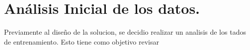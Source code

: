 \chapter{Análisis Inicial de los datos.}
Previamente al diseño de la solucion, se decidio realizar un analisis de los tados de entrenamiento. Esto tiene como objetivo revisar
